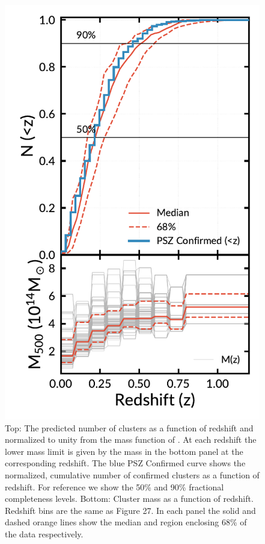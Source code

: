 \documentclass[apj, revtex4-1]{emulateapj}
\begin{document}
\begin{figure}
	\includegraphics[width=\columnwidth]{cluster_forecast.pdf}
	\caption{Top: The predicted number of clusters as a function of redshift and normalized to unity from the mass function of \cite{Tinker2008}. At each redshift the lower mass limit is given by the mass in the bottom panel at the corresponding redshift. The blue PSZ Confirmed curve shows the normalized, cumulative number of confirmed clusters as a function of redshift. For reference we show the 50\% and 90\% fractional completeness levels. Bottom: Cluster mass as a function of redshift. Redshift bins are the same as \cite{PlanckCollaboration2015a} Figure 27. In each panel the solid and dashed orange lines show the median and region enclosing 68\% of the data respectively.}
	\label{fig:cluster_forecast}
\end{figure}
\end{document}
